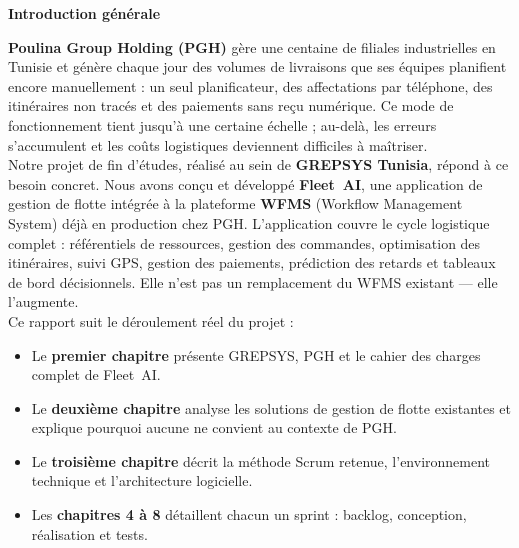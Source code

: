 \vspace*{0.6\baselineskip}
\begin{center}
  {\Huge\bfseries Introduction générale}
\end{center}
\vspace{1.5cm}

\textbf{Poulina Group Holding (PGH)} gère une centaine de filiales industrielles en Tunisie et génère chaque jour des volumes de livraisons que ses équipes planifient encore manuellement : un seul planificateur, des affectations par téléphone, des itinéraires non tracés et des paiements sans reçu numérique. Ce mode de fonctionnement tient jusqu'à une certaine échelle ; au-delà, les erreurs s'accumulent et les coûts logistiques deviennent difficiles à maîtriser.\\

Notre projet de fin d'études, réalisé au sein de \textbf{GREPSYS Tunisia}, répond à ce besoin concret. Nous avons conçu et développé \textbf{Fleet~AI}, une application de gestion de flotte intégrée à la plateforme \textbf{WFMS} (Workflow Management System) déjà en production chez PGH. L'application couvre le cycle logistique complet : référentiels de ressources, gestion des commandes, optimisation des itinéraires, suivi GPS, gestion des paiements, prédiction des retards et tableaux de bord décisionnels. Elle n'est pas un remplacement du WFMS existant --- elle l'augmente.\\

Ce rapport suit le déroulement réel du projet :

\begin{itemize}
    \item[$\bullet$] Le \textbf{premier chapitre} présente GREPSYS, PGH et le cahier des charges complet de Fleet~AI.
    \item[$\bullet$] Le \textbf{deuxième chapitre} analyse les solutions de gestion de flotte existantes et explique pourquoi aucune ne convient au contexte de PGH.
    \item[$\bullet$] Le \textbf{troisième chapitre} décrit la méthode Scrum retenue, l'environnement technique et l'architecture logicielle.
    \item[$\bullet$] Les \textbf{chapitres 4 à 8} détaillent chacun un sprint : backlog, conception, réalisation et tests.
\end{itemize}
